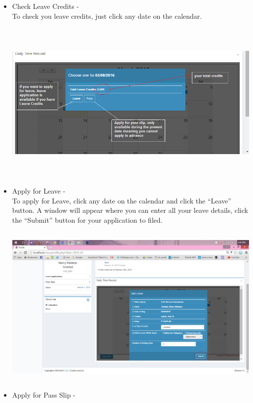 \begin{itemize}
\begin{center}
	\end{center}
	\begin{itemize}
		\item Check Leave Credits - \\
		To check you leave credits, just click any date on the calendar.\\
		\begin{center}
			\includegraphics[width=13cm,height=8cm]{image/checkLC.png}
		\end{center} 
		\item Apply for Leave - \\
		To apply for Leave, click any date on the calendar and click the “Leave” button. A window will appear where you can enter all your leave details, click the “Submit” button for your application to filed. \\
		\begin{center}
			\includegraphics[width=13cm,height=8cm]{image/Leave.png}
		\end{center}
		\item Apply for Pass Slip - \\

\end{itemize}
\end{itemize}
